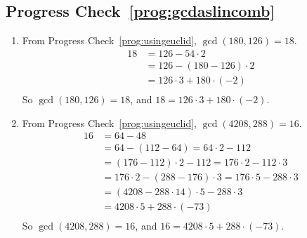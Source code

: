 \subsection*{Progress Check~\ref{prog:gcdaslincomb}}
\begin{enumerate}
\item From Progress Check~\ref{prog:usingeuclid}, $\gcd ( {180, 126} ) = 18$.
\[
\begin{aligned}
18 &= 126 - 54 \cdot 2 \\    
  &= 126 - ( {180 - 126} ) \cdot 2 \\    
  &= 126 \cdot 3 + 180 \cdot ( { - 2} ) \\ 
\end{aligned}
\]
So $\gcd ( {180, 126} ) = 18$, and 
$18 = 126 \cdot 3 + 180 \cdot ( { - 2} )$.


\item From Progress Check~\ref{prog:usingeuclid}, $\gcd ( {4208, 288} ) = 16$.
\[
\begin{aligned}  
16 &= 64 - 48 \\    
  &= 64 - ( {112 - 64} ) = 64 \cdot 2 - 112 \\    
  &= ( {176 - 112} ) \cdot 2 - 112 = 176 \cdot 2 - 112 \cdot 3 \\    
  &= 176 \cdot 2 - ( {288 - 176} ) \cdot 3 = 176 \cdot 5 - 288 \cdot 3 \\    
  &= ( {4208 - 288 \cdot 14} ) \cdot 5 - 288 \cdot 3 \\    
  &= 4208 \cdot 5 + 288 \cdot ( { - 73} ) \\ 
\end{aligned}
\]
So $\gcd ( {4208, 288} ) = 16$, and 
$16 = 4208 \cdot 5 + 288 \cdot ( { - 73} )$.
\end{enumerate}

\hbreak

\endinput
